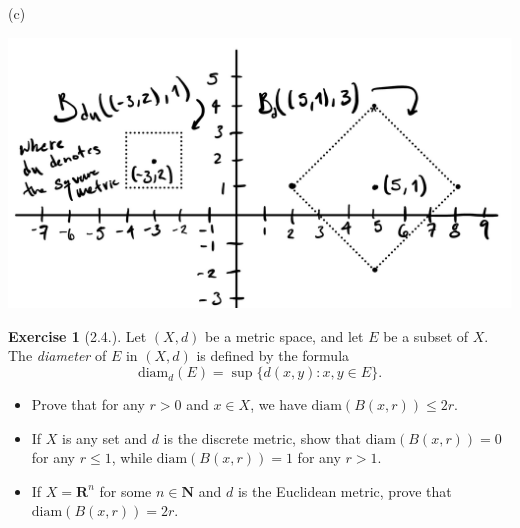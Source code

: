 \documentclass[9pt,reqno]{amsart}
\theoremstyle{definition}
\newtheorem{exercise}{Exercise}[section]
\newcommand{\rr}{\mathbf R}
\newcommand{\nn}{\mathbf N}
\begin{document}
	(c) 
	
	\includegraphics[scale = .2]{IMG_0688.jpg} 
\newpage
\begin{exercise}[2.4.] Let $(X,d)$ be a metric space, and let $E$ be a subset of $X$. The \textit{diameter} of $E$ in $(X,d)$ is defined by the formula 
\[
\text{diam}_d (E) = \sup \{ d(x,y) \colon x,y \in E \}.
\]
\begin{itemize}
	\item[(a)] Prove that for any $r >0$ and $x \in X$, we have $\text{diam} (B(x,r)) \leq 2r$.
	\item[(b)] If $X$ is any set and $d$ is the discrete metric, show that $\text{diam} (B(x, r)) = 0$ for any $r \leq 1$, while $\text{diam} (B(x, r)) = 1$ for any $r > 1$.
	\item[(c)] If $X = \rr^n$ for some $n \in \nn$ and $d$ is the Euclidean metric, prove that $\text{diam} (B(x,r)) = 2r$.
\end{itemize}
\end{exercise}
\end{document}
